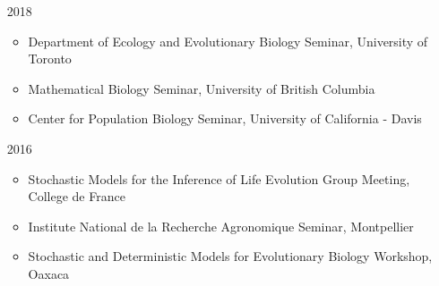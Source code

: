 \documentclass[12pt]{article}
\begin{document}
\begin{itemize}

    \item [2018]
      \begin{itemize}
      \item Department of Ecology and Evolutionary Biology Seminar, University of Toronto
      \item Mathematical Biology Seminar, University of British Columbia
      \item Center for Population Biology Seminar, University of California - Davis
      \end{itemize}


    \item [2016]
      \begin{itemize}
      \item Stochastic Models for the Inference of Life Evolution Group Meeting, College de France
      \item Institute National de la Recherche Agronomique Seminar, Montpellier
      \item Stochastic and Deterministic Models for Evolutionary Biology Workshop, Oaxaca
      \end{itemize}


\end{itemize}
\end{document}
